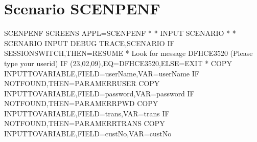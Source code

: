 \documentclass[letterpaper,10pt,english]{sphinxmanual}
\begin{document}
\section{Scenario SCENPENF}
\label{\detokenize{TN202001:scenario-scenpenf}}
\begin{sphinxVerbatim}[commandchars=\\\{\}]
SCENPENF SCREENS APPL=SCENPENF
*\PYGZsh{}\PYGZsh{}\PYGZsh{}\PYGZsh{}\PYGZsh{}\PYGZsh{}\PYGZsh{}\PYGZsh{}\PYGZsh{}\PYGZsh{}\PYGZsh{}\PYGZsh{}\PYGZsh{}\PYGZsh{}\PYGZsh{}\PYGZsh{}\PYGZsh{}\PYGZsh{}\PYGZsh{}\PYGZsh{}\PYGZsh{}\PYGZsh{}\PYGZsh{}\PYGZsh{}\PYGZsh{}\PYGZsh{}\PYGZsh{}\PYGZsh{}\PYGZsh{}\PYGZsh{}\PYGZsh{}\PYGZsh{}\PYGZsh{}\PYGZsh{}\PYGZsh{}\PYGZsh{}\PYGZsh{}\PYGZsh{}\PYGZsh{}\PYGZsh{}\PYGZsh{}\PYGZsh{}\PYGZsh{}\PYGZsh{}\PYGZsh{}\PYGZsh{}\PYGZsh{}\PYGZsh{}\PYGZsh{}\PYGZsh{}\PYGZsh{}\PYGZsh{}\PYGZsh{}\PYGZsh{}\PYGZsh{}\PYGZsh{}\PYGZsh{}\PYGZsh{}\PYGZsh{}\PYGZsh{}\PYGZsh{}\PYGZsh{}\PYGZsh{}\PYGZsh{}\PYGZsh{}\PYGZsh{}\PYGZsh{}\PYGZsh{}\PYGZsh{}\PYGZsh{}
*\PYGZsh{}\PYGZsh{}                         INPUT SCENARIO                           \PYGZsh{}\PYGZsh{}
*\PYGZsh{}\PYGZsh{}\PYGZsh{}\PYGZsh{}\PYGZsh{}\PYGZsh{}\PYGZsh{}\PYGZsh{}\PYGZsh{}\PYGZsh{}\PYGZsh{}\PYGZsh{}\PYGZsh{}\PYGZsh{}\PYGZsh{}\PYGZsh{}\PYGZsh{}\PYGZsh{}\PYGZsh{}\PYGZsh{}\PYGZsh{}\PYGZsh{}\PYGZsh{}\PYGZsh{}\PYGZsh{}\PYGZsh{}\PYGZsh{}\PYGZsh{}\PYGZsh{}\PYGZsh{}\PYGZsh{}\PYGZsh{}\PYGZsh{}\PYGZsh{}\PYGZsh{}\PYGZsh{}\PYGZsh{}\PYGZsh{}\PYGZsh{}\PYGZsh{}\PYGZsh{}\PYGZsh{}\PYGZsh{}\PYGZsh{}\PYGZsh{}\PYGZsh{}\PYGZsh{}\PYGZsh{}\PYGZsh{}\PYGZsh{}\PYGZsh{}\PYGZsh{}\PYGZsh{}\PYGZsh{}\PYGZsh{}\PYGZsh{}\PYGZsh{}\PYGZsh{}\PYGZsh{}\PYGZsh{}\PYGZsh{}\PYGZsh{}\PYGZsh{}\PYGZsh{}\PYGZsh{}\PYGZsh{}\PYGZsh{}\PYGZsh{}\PYGZsh{}\PYGZsh{}
*
         SCENARIO INPUT
         DEBUG\PYGZdl{} TRACE,SCENARIO
         IF\PYGZdl{} SESSION\PYGZhy{}SWITCH,THEN=RESUME
* Look for message DFHCE3520 (Please type your userid)
         IF\PYGZdl{}  (23,02,09),EQ=\PYGZsq{}DFHCE3520\PYGZsq{},ELSE=EXIT
*
         COPY\PYGZdl{} INPUT\PYGZhy{}TO\PYGZhy{}VARIABLE,FIELD=\PYGZsq{}userName\PYGZsq{},VAR=\PYGZsq{}userName\PYGZsq{}
         IF\PYGZdl{}   NOT\PYGZhy{}FOUND,THEN=PARAM\PYGZus{}ERR\PYGZus{}USER
         COPY\PYGZdl{} INPUT\PYGZhy{}TO\PYGZhy{}VARIABLE,FIELD=\PYGZsq{}password\PYGZsq{},VAR=\PYGZsq{}password\PYGZsq{}
         IF\PYGZdl{}   NOT\PYGZhy{}FOUND,THEN=PARAM\PYGZus{}ERR\PYGZus{}PWD
         COPY\PYGZdl{} INPUT\PYGZhy{}TO\PYGZhy{}VARIABLE,FIELD=\PYGZsq{}trans\PYGZsq{},VAR=\PYGZsq{}trans\PYGZsq{}
         IF\PYGZdl{}   NOT\PYGZhy{}FOUND,THEN=PARAM\PYGZus{}ERR\PYGZus{}TRANS
         COPY\PYGZdl{} INPUT\PYGZhy{}TO\PYGZhy{}VARIABLE,FIELD=\PYGZsq{}custNo\PYGZsq{},VAR=\PYGZsq{}custNo\PYGZsq{}

\end{sphinxVerbatim}
\end{document}
